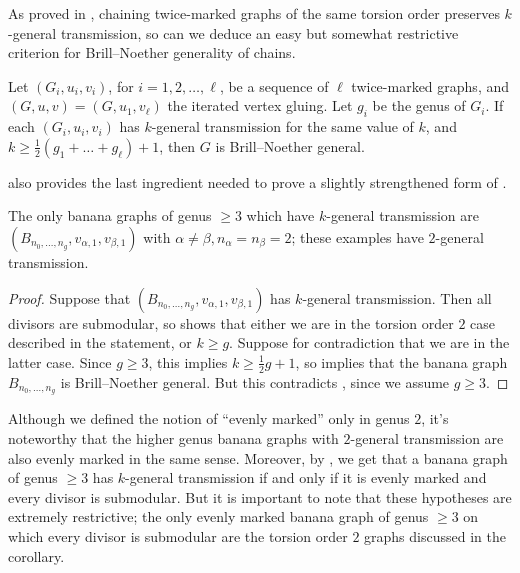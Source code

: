 As proved in \cite[Theorem A]{Pfl22}, chaining twice-marked graphs of the same torsion order preserves $k$-general transmission, so can we deduce an easy but somewhat restrictive criterion for Brill--Noether generality of chains.

\begin{coro}
Let $(G_i, u_i, v_i)$, for $i=1,2, \ldots, \ell$, be a sequence of $\ell$ twice-marked graphs, and $(G,u,v) = (G,u_1, v_\ell)$ the iterated vertex gluing. Let $g_i$ be the genus of $G_i$. If each $(G_i,u_i,v_i)$ has $k$-general transmission for the same value of $k$, and $k \geq \frac12 (g_1 + \ldots + g_\ell) + 1$, then $G$ is Brill--Noether general.
\end{coro}

 also provides the last ingredient needed to prove a slightly strengthened form of .

\begin{coro} \label{cor:bananasWithKGT}
    The only banana graphs of genus $\geq 3$ which have $k$-general transmission are $(B_{n_0, \ldots, n_g},v_{\alpha,1},v_{\beta,1})$ with $\alpha \neq \beta, n_\alpha = n_\beta = 2$; these examples have $2$-general transmission.
\end{coro}

\begin{proof}
Suppose that $(B_{n_0, \ldots, n_g},v_{\alpha,1},v_{\beta,1})$ has $k$-general transmission. Then all divisors are submodular, so
 shows that either we are in the torsion order $2$ case described in the statement, or $k \geq g$. Suppose for contradiction that we are in the latter case. Since $g \geq 3$, this implies $k \geq \frac12 g + 1$, so  implies that the banana graph $B_{n_0, \ldots, n_g}$ is Brill--Noether general. But  this contradicts , since we assume $g \geq 3$.
\end{proof}

\begin{rema}
    Although we defined the notion of ``evenly marked'' only in genus $2$, it's noteworthy that the higher genus banana graphs with $2$-general transmission are also evenly marked in the same sense. Moreover, by , we get that a banana graph of genus $\geq 3$ has $k$-general transmission if and only if it is evenly marked and every divisor is submodular. But it is important to note that these hypotheses are extremely restrictive; the only evenly marked banana graph of genus $\geq 3$ on which every divisor is submodular are the torsion order $2$ graphs discussed in the corollary.
\end{rema}

